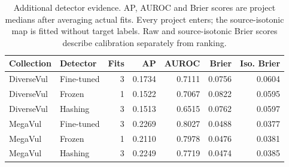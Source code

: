 \begin{table}[htbp]\centering\small
\caption{Additional detector evidence. AP, AUROC and Brier scores are project medians after averaging actual fits. Every project enters; the source-isotonic map is fitted without target labels. Raw and source-isotonic Brier scores describe calibration separately from ranking.}
\label{tab:newdetectors}
\begin{tabular}{@{}llrrrrr@{}}\toprule Collection & Detector & Fits & AP & AUROC & Brier & Iso. Brier\\\midrule
DiverseVul & Fine-tuned & 3 & 0.1734 & 0.7111 & 0.0756 & 0.0604\\
DiverseVul & Frozen & 1 & 0.1522 & 0.7067 & 0.0822 & 0.0595\\
DiverseVul & Hashing & 3 & 0.1513 & 0.6515 & 0.0762 & 0.0597\\
MegaVul & Fine-tuned & 3 & 0.2269 & 0.8027 & 0.0488 & 0.0377\\
MegaVul & Frozen & 1 & 0.2110 & 0.7978 & 0.0476 & 0.0381\\
MegaVul & Hashing & 3 & 0.2249 & 0.7719 & 0.0474 & 0.0385\\
\bottomrule\end{tabular}\end{table}

